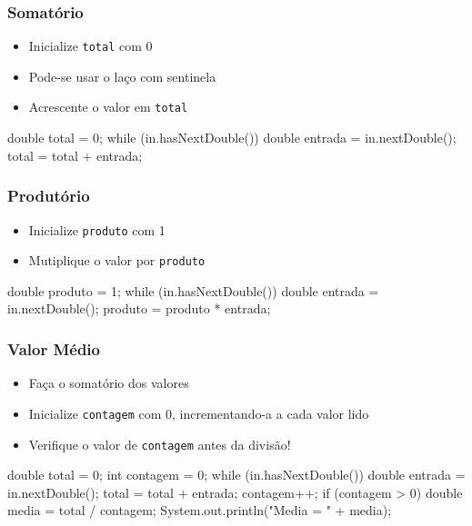 \documentclass[xcolor={dvipsnames,table},aspectratio=169]{beamer}
\begin{document}
\begin{frame}[fragile]\frametitle{Somatório}
\begin{itemize}
	\item Inicialize \texttt{total} com 0
	\item Pode-se usar o laço com sentinela
	\item Acrescente o valor em \texttt{total}
\end{itemize}
\begin{javacode}
double total = 0;
while (in.hasNextDouble()) {
   double entrada = in.nextDouble();
   total = total + entrada;
}
\end{javacode}
\end{frame}

\begin{frame}[fragile]\frametitle{Produtório}
\begin{itemize}
	\item Inicialize \texttt{produto} com 1
	\item Mutiplique o valor por \texttt{produto}
\end{itemize}
\begin{javacode}
double produto = 1;
while (in.hasNextDouble()) {
   double entrada = in.nextDouble();
   produto = produto * entrada;
}
\end{javacode}
\end{frame}

\begin{frame}[fragile]\frametitle{Valor Médio}
\begin{itemize}
	\item Faça o somatório dos valores
	\item Inicialize \texttt{contagem} com 0, incrementando-a a cada valor lido
	\item Verifique o valor de \texttt{contagem} antes da divisão!
\end{itemize}
{\footnotesize
\begin{javacode}
double total = 0;
int contagem = 0;
while (in.hasNextDouble()) {
   double entrada = in.nextDouble();
   total = total + entrada;
   contagem++;
}
if (contagem > 0) {
   double media = total / contagem;
   System.out.println("Media = " + media);
}
\end{javacode}
}
\end{frame}
\end{document}
